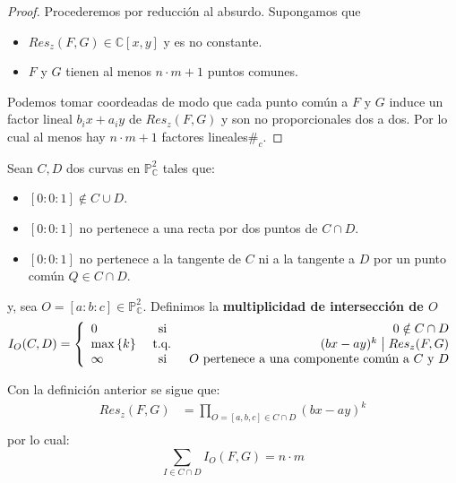 \documentclass[12pt]{report}
\newcounter{it}
\theoremstyle{largebreak}
\newcommand\divides{\ensuremath{\bigm|}}
\newcommand\contradiction{\ensuremath{\#_c}}
\begin{document}
    \begin{proof}
        Procederemos por reducción al absurdo. Supongamos que
        \begin{itemize}
            \item $Res_z(F,G)\in\mathbb{C}[x,y]$ y es no constante.
            \item $F$ y $G$ tienen al menos $n\cdot m+1$ puntos comunes.
        \end{itemize}
        Podemos tomar coordeadas de modo que cada punto común a $F$ y $G$ induce un factor lineal $b_ix+a_iy$ de $Res_z(F,G)$ y son no proporcionales dos a dos. Por lo cual al menos hay $n\cdot m+1$ factores lineales\contradiction.
    \end{proof}

    \begin{mydef}
        Sean $C,D$ dos curvas en $\mathbb{P}_\mathbb{C}^2$ tales que:
        \begin{itemize}
            \item $[0:0:1]\notin C\cup D$.
            \item $[0:0:1]$ no pertenece a una recta por dos puntos de $C\cap D$.
            \item $[0:0:1]$ no pertenece a la tangente de $C$ ni a la tangente a $D$ por un punto común $Q\in C\cap D$.
        \end{itemize}
        y, sea $O=[a:b:c]\in\mathbb{P}_{\mathbb{C}}^2$. Definimos la \textbf{multiplicidad de intersección de $O$}
        \begin{equation*}
            I_O(C,D)=\left\{
                \begin{array}{lcr}
                    0 & \textup{ si } & 0\notin C\cap D\\
                    \max\left\{k \right\} & \textup{ t.q. } & (bx-ay)^k\divides Res_z(F,G) \\
                    \infty & \textup{ si } & O\textup{ pertenece a una componente común a $C$ y $D$} \\
                \end{array}
            \right.
        \end{equation*}
    \end{mydef}

    Con la definición anterior se sigue que:
    \begin{equation*}
        \begin{split}
            Res_z(F,G)&=\prod_{ O=[a,b,c]\in C\cap D}(bx-ay)^k\\
        \end{split}
    \end{equation*}
    por lo cual:
    \begin{equation*}
        \sum_{ I\in C\cap D}I_O(F,G)=n\cdot m
    \end{equation*}
\end{document}
